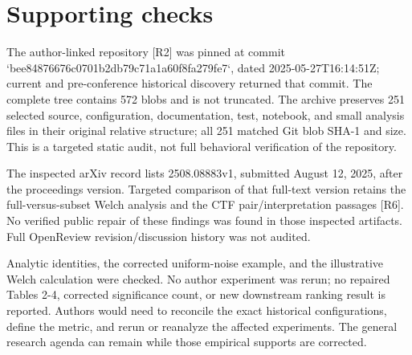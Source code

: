 \documentclass[10pt]{article}
\begin{document}
\section*{Supporting checks}
The author-linked repository [R2] was pinned at commit `bee84876676c0701b2db79c71a1a60f8fa279fe7`, dated 2025-05-27T16:14:51Z; current and pre-conference historical discovery returned that commit. The complete tree contains 572 blobs and is not truncated. The archive preserves 251 selected source, configuration, documentation, test, notebook, and small analysis files in their original relative structure; all 251 matched Git blob SHA-1 and size. This is a targeted static audit, not full behavioral verification of the repository.\par
The inspected arXiv record lists 2508.08883v1, submitted August 12, 2025, after the proceedings version. Targeted comparison of that full-text version retains the full-versus-subset Welch analysis and the CTF pair/interpretation passages [R6]. No verified public repair of these findings was found in those inspected artifacts. Full OpenReview revision/discussion history was not audited.\par
Analytic identities, the corrected uniform-noise example, and the illustrative Welch calculation were checked. No author experiment was rerun; no repaired Tables 2-4, corrected significance count, or new downstream ranking result is reported. Authors would need to reconcile the exact historical configurations, define the metric, and rerun or reanalyze the affected experiments. The general research agenda can remain while those empirical supports are corrected.\par
\end{document}
